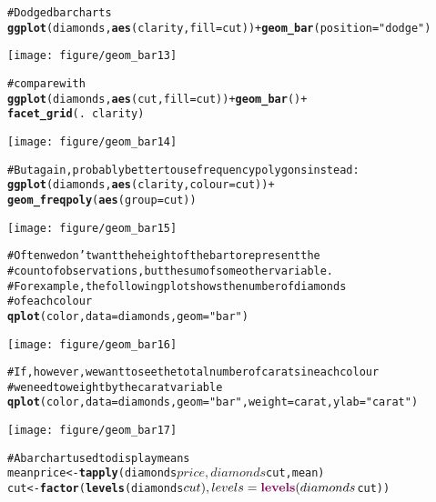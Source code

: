 \documentclass[a4paper,titlepage]{tufte-handout}\usepackage{graphicx, color}
\makeatletter
\def\maxwidth{ %
  \ifdim\Gin@nat@width>\linewidth
    \linewidth
  \else
    \Gin@nat@width
  \fi
}
\newcommand{\hlfunctioncall}[1]{\textcolor[rgb]{0.501960784313725,0,0.329411764705882}{\textbf{#1}}}%
\newcommand{\hlstring}[1]{\textcolor[rgb]{0.6,0.6,1}{#1}}%
\newcommand{\hlcomment}[1]{\textcolor[rgb]{0.180392156862745,0.6,0.341176470588235}{#1}}%
\newenvironment{kframe}{%
 \def\at@end@of@kframe{}%
 \ifinner\ifhmode%
  \def\at@end@of@kframe{\end{minipage}}%
  \begin{minipage}{\columnwidth}%
 \fi\fi%
 \def\FrameCommand##1{\hskip\@totalleftmargin \hskip-\fboxsep
 \colorbox{shadecolor}{##1}\hskip-\fboxsep
     \hskip-\linewidth \hskip-\@totalleftmargin \hskip\columnwidth}%
 \MakeFramed {\advance\hsize-\width
   \@totalleftmargin\z@ \linewidth\hsize
   \@setminipage}}%
 {\par\unskip\endMakeFramed%
 \at@end@of@kframe}
\newenvironment{knitrout}{}{} %
\makeatother
\begin{document}
\begin{knitrout}
\begin{kframe}
\begin{alltt}
\hlcomment{# Dodged bar charts}
\hlfunctioncall{ggplot}(diamonds, \hlfunctioncall{aes}(clarity, fill=cut)) + \hlfunctioncall{geom_bar}(position=\hlstring{"dodge"})
\end{alltt}
\end{kframe}\texttt{[image: figure/geom\_bar13]} \begin{kframe}\begin{alltt}
\hlcomment{# compare with}
\hlfunctioncall{ggplot}(diamonds, \hlfunctioncall{aes}(cut, fill=cut)) + \hlfunctioncall{geom_bar}() +
  \hlfunctioncall{facet_grid}(. ~ clarity)
\end{alltt}
\end{kframe}\texttt{[image: figure/geom\_bar14]} \begin{kframe}\begin{alltt}
\hlcomment{# But again, probably better to use frequency polygons instead:}
\hlfunctioncall{ggplot}(diamonds, \hlfunctioncall{aes}(clarity, colour=cut)) +
  \hlfunctioncall{geom_freqpoly}(\hlfunctioncall{aes}(group = cut))
\end{alltt}
\end{kframe}\texttt{[image: figure/geom\_bar15]} \begin{kframe}\begin{alltt}
\hlcomment{# Often we don't want the height of the bar to represent the}
\hlcomment{# count of observations, but the sum of some other variable.}
\hlcomment{# For example, the following plot shows the number of diamonds}
\hlcomment{# of each colour}
\hlfunctioncall{qplot}(color, data=diamonds, geom=\hlstring{"bar"})
\end{alltt}
\end{kframe}\texttt{[image: figure/geom\_bar16]} \begin{kframe}\begin{alltt}
\hlcomment{# If, however, we want to see the total number of carats in each colour}
\hlcomment{# we need to weight by the carat variable}
\hlfunctioncall{qplot}(color, data=diamonds, geom=\hlstring{"bar"}, weight=carat, ylab=\hlstring{"carat"})
\end{alltt}
\end{kframe}\texttt{[image: figure/geom\_bar17]} \begin{kframe}\begin{alltt}
\hlcomment{# A bar chart used to display means}
meanprice <- \hlfunctioncall{tapply}(diamonds$price, diamonds$cut, mean)
cut <- \hlfunctioncall{factor}(\hlfunctioncall{levels}(diamonds$cut), levels = \hlfunctioncall{levels}(diamonds$cut))

\end{alltt}
\end{kframe}
\end{knitrout}
\end{document}
